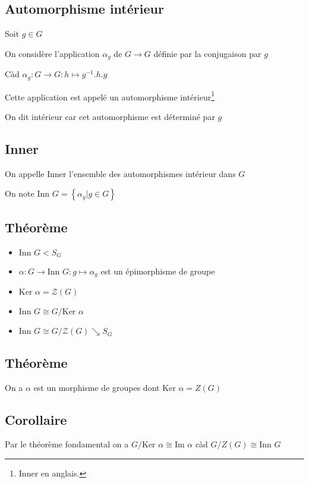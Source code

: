 \documentclass[a4paper,10pt]{article}
\newcommand{\Ker}{\mbox{Ker }}
\newcommand{\im}{\mbox{Im }}
\newcommand{\ap}{\rightarrow}
\newcommand{\tset}[1]{\left\lbrace #1 \right\rbrace}
\newcommand{\Inn}{\mbox{Inn }}
\begin{document}
\subsection{Automorphisme intérieur}

Soit $g \in G$

On considère l'application $\alpha_g$ de $G \ap G$ définie par la conjugaison par $g$

Càd $\alpha_g : G \ap G : h \mapsto g^{-1}.h.g$

Cette application est appelé un automorphisme intérieur\footnote{Inner en anglais.}

On dit intérieur car cet automorphisme est déterminé par $g$

\subsection{Inner}

On appelle Inner l'ensemble des automorphismes intérieur dans $G$

On note $\Inn G = \tset{\alpha_g \vert g \in G}$

\subsection{Théorème}

\begin{itemize}
\item{$\Inn G < S_G$}
\item{$\alpha : G \ap \Inn G : g \mapsto \alpha_g$ est un épimorphisme de groupe}
\item{$\Ker \alpha = \mathcal{Z}(G)$}
\item{$\Inn G \cong G/\Ker \alpha$}
\item{$\Inn G \cong G / \mathcal{Z}(G) \searrow S_G$}	
\end{itemize}

\subsection{Théorème}

On a $\alpha$ est un morphisme de groupes dont $\Ker \alpha = Z(G)$

\subsection{Corollaire}

Par le théorème fondamental on a $G/\Ker \alpha \cong \im \alpha$ càd $G/Z(G) \cong \Inn G$
\end{document}
